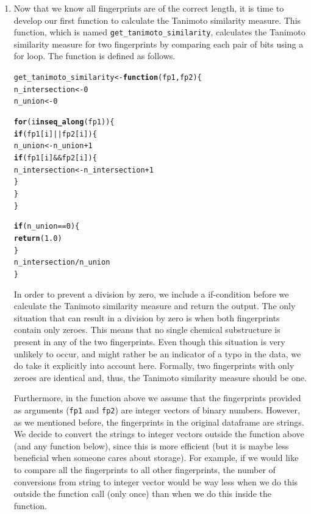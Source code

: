 \documentclass[a4paper,11pt]{article}\usepackage[]{graphicx}\usepackage[]{xcolor}
\makeatletter
\newcommand{\hlnum}[1]{\textcolor[rgb]{0.686,0.059,0.569}{#1}}%
\newcommand{\hlopt}[1]{\textcolor[rgb]{0,0,0}{#1}}%
\newcommand{\hldef}[1]{\textcolor[rgb]{0.345,0.345,0.345}{#1}}%
\newcommand{\hlkwa}[1]{\textcolor[rgb]{0.161,0.373,0.58}{\textbf{#1}}}%
\newcommand{\hlkwb}[1]{\textcolor[rgb]{0.69,0.353,0.396}{#1}}%
\newcommand{\hlkwc}[1]{\textcolor[rgb]{0.333,0.667,0.333}{#1}}%
\newcommand{\hlkwd}[1]{\textcolor[rgb]{0.737,0.353,0.396}{\textbf{#1}}}%
\newenvironment{kframe}{%
 \def\at@end@of@kframe{}%
 \ifinner\ifhmode%
  \def\at@end@of@kframe{\end{minipage}}%
  \begin{minipage}{\columnwidth}%
 \fi\fi%
 \def\FrameCommand##1{\hskip\@totalleftmargin \hskip-\fboxsep
 \colorbox{shadecolor}{##1}\hskip-\fboxsep
     \hskip-\linewidth \hskip-\@totalleftmargin \hskip\columnwidth}%
 \MakeFramed {\advance\hsize-\width
   \@totalleftmargin\z@ \linewidth\hsize
   \@setminipage}}%
 {\par\unskip\endMakeFramed%
 \at@end@of@kframe}
\newenvironment{knitrout}{}{} %
\newcommand{\code}[1]{\texttt{#1}}
\makeatother
\begin{document}
\begin{enumerate}
\item Now that we know all fingerprints are of the correct length, it is time to develop our first function to calculate the Tanimoto similarity measure. This function, which is named \code{get\_tanimoto\_similarity}, calculates the Tanimoto similarity measure for two fingerprints by comparing each pair of bits using a for loop. The function is defined as follows. 

\begin{knitrout}
\color{fgcolor}\begin{kframe}
\begin{alltt}
\hldef{get_tanimoto_similarity} \hlkwb{<-} \hlkwa{function}\hldef{(}\hlkwc{fp1}\hldef{,} \hlkwc{fp2}\hldef{) \{}
  \hldef{n_intersection} \hlkwb{<-} \hlnum{0}
  \hldef{n_union} \hlkwb{<-} \hlnum{0}

  \hlkwa{for} \hldef{(i} \hlkwa{in} \hlkwd{seq_along}\hldef{(fp1)) \{}
    \hlkwa{if} \hldef{(fp1[i]} \hlopt{||} \hldef{fp2[i]) \{}
      \hldef{n_union} \hlkwb{<-} \hldef{n_union} \hlopt{+} \hlnum{1}
      \hlkwa{if} \hldef{(fp1[i]} \hlopt{&&} \hldef{fp2[i]) \{}
        \hldef{n_intersection} \hlkwb{<-} \hldef{n_intersection} \hlopt{+} \hlnum{1}
      \hldef{\}}
    \hldef{\}}
  \hldef{\}}

  \hlkwa{if} \hldef{(n_union} \hlopt{==} \hlnum{0}\hldef{) \{}
    \hlkwd{return}\hldef{(}\hlnum{1.0}\hldef{)}
  \hldef{\}}
  \hldef{n_intersection} \hlopt{/} \hldef{n_union}
\hldef{\}}
\end{alltt}
\end{kframe}
\end{knitrout}

In order to prevent a division by zero, we include a if-condition before we calculate the Tanimoto similarity measure and return the output. The only situation that can result in a division by zero is when both fingerprints contain only zeroes. This means that no single chemical substructure is present in any of the two fingerprints. Even though this situation is very unlikely to occur, and might rather be an indicator of a typo in the data, we do take it explicitly into account here. Formally, two fingerprints with only zeroes are identical and, thus, the Tanimoto similarity measure should be one. \par

Furthermore, in the function above we assume that the fingerprints provided as arguments (\code{fp1} and \code{fp2}) are integer vectors of binary numbers. However, as we mentioned before, the fingerprints in the original dataframe are strings. We decide to convert the strings to integer vectors outside the function above (and any function below), since this is more efficient (but it is maybe less beneficial when someone cares about storage). For example, if we would like to compare all the fingerprints to all other fingerprints, the number of conversions from string to integer vector would be way less when we do this outside the function call (only once) than when we do this inside the function. \par 


\end{enumerate}
\end{document}
